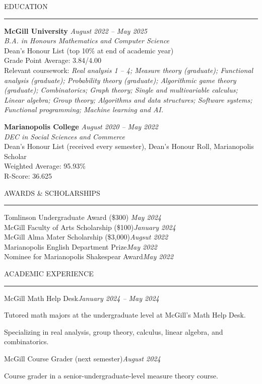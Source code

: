 \documentclass{resume}
\renewenvironment{rSection}[1]{
\sectionskip
\textcolor{CarnegieMellonRed}{\MakeUppercase{#1}}
\sectionlineskip
\hrule
\begin{list}{}{
\setlength{\leftmargin}{1.5em}
}
\item[]
}{
\end{list}
}
\begin{document}
\begin{rSection}{Education}
{\bf McGill University} \hfill {\em August 2022 -- May 2025} 
\\ \emph{B.A. in Honours Mathematics and Computer Science} \hfill
\vspace{0.1cm}
\\ Dean's Honour List (top 10\% at end of academic year)
\\ Grade Point Average: 3.84/4.00 \hfill
\\ Relevant coursework: \textit{Real analysis 1 -- 4; Measure theory (graduate); Functional analysis (graduate); Probability theory (graduate); Algorithmic game theory (graduate); Combinatorics; Graph theory; Single and multivariable calculus; Linear algebra; Group theory; Algorithms and data structures; Software systems; Functional programming; Machine learning and AI.}

{\bf Marianopolis College} \hfill {\em August 2020 -- May 2022} 
\\ \emph{DEC in Social Sciences and Commerce}
\vspace{0.1cm}
\\ Dean's Honour List (received every semester), Dean's Honour Roll, Marianopolis Scholar
\\ Weighted Average: 95.93\%
\\ R-Score: 36.625
\end{rSection}

\begin{rSection}{Awards \& Scholarships} \itemsep -2pt
{Tomlinson Undergraduate Award (\$300)} \hfill {\em May 2024} \\
{McGill Faculty of Arts Scholarship (\$100)}\hfill {\em January 2024} \\
{McGill Alma Mater Scholarship (\$3,000)}\hfill {\em Augsut 2022} \\
{Marianopolis English Department Prize}\hfill {\em May 2022} \\
{Nominee for Marianopolis Shakespear Award}\hfill {\em May 2022}
\end{rSection}

\begin{rSection}{Academic Experience}
\begin{rSubsection}{McGill Math Help Desk}{\em January 2024 -- May 2024}{} 

\item Tutored math majors at the undergraduate level at McGill's Math Help Desk.
\item Specializing in real analysis, group theory, calculus, linear algebra, and combinatorics.
\end{rSubsection}
\begin{rSubsection}{McGill Course Grader (next semester)}{\em August 2024}{} 

\item Course grader in a senior-undergraduate-level measure theory course.
\end{rSubsection}
\end{rSection}
\end{document}
